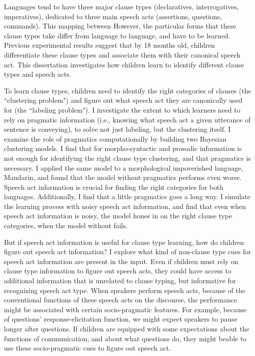 
Languages tend to have three major clause types (declaratives, interrogatives, imperatives), dedicated to three main speech acts (assertions, questions, commands). This mapping between  However, the particular forms that these clause types take differ from language to language, and have to be learned. Previous experimental results suggest that by 18 months old, children differentiate these clause types and associate them with their canonical speech act. This dissertation investigates how children learn to identify different clause types and speech acts. 

To learn clause types, children need to identify the right categories of clauses (the ``clustering problem") and figure out what speech act they are canonically used for (the ``labeling problem"). I investigate the extent to which learners need to rely on pragmatic information (i.e., knowing what speech act a given utterance of sentence is conveying), to solve not just labeling, but the clustering itself. I examine the role of pragmatics computationally by building two Bayesian clustering models. I find that for morpho-syntactic and prosodic information is not enough for identifying the right clause type clustering, and that pragmatics is necessary. I applied the same model to a morphological impoverished language, Mandarin, and found that the model without pragmatics performs even worse. Speech act information is crucial for finding the right categories for both languages. Additionally, I find that a little pragmatics goes a long way. I simulate the learning process with noisy speech act information, and find that even when speech act information is noisy, the model hones in on the right clause type categories, when the model without fails. 


But if speech act information is useful for clause type learning, how do children figure out speech act information? I explore what kind of non-clause type cues for speech act information are present in the input. Even if children must rely on clause type information to figure out speech acts, they could have access to additional information that is unrelated to clause typing, but informative for recognizing speech act type. When speakers perform speech acts, because of the conventional functions of these speech acts on the discourse, the performance might be associated with certain socio-pragmatic features. For example, because of questions' response-elicitation function, we might expect speakers to pause longer after questions. If children are equipped with some expectations about the functions of communication, and about what questions do, they might beable to use these socio-pragmatic cues to figure out speech act. 

